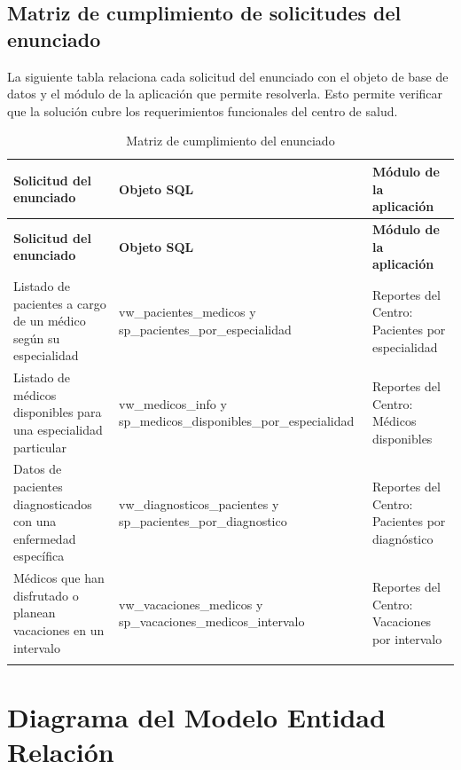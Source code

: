 \documentclass[12pt,a4paper]{article}
\begin{document}
\vspace{0.5cm}

\subsection{Matriz de cumplimiento de solicitudes del enunciado}

La siguiente tabla relaciona cada solicitud del enunciado con el objeto de base de datos y el módulo de la aplicación que permite resolverla. Esto permite verificar que la solución cubre los requerimientos funcionales del centro de salud.

{\small
\begin{longtable}{|p{5cm}|p{4cm}|p{5cm}|}
\hline
\textbf{Solicitud del enunciado} & \textbf{Objeto SQL} & \textbf{Módulo de la aplicación} \\ \hline
\endfirsthead
\hline
\textbf{Solicitud del enunciado} & \textbf{Objeto SQL} & \textbf{Módulo de la aplicación} \\ \hline
\endhead

Listado de pacientes a cargo de un médico según su especialidad & vw\_pacientes\_medicos y sp\_pacientes\_por\_especialidad & Reportes del Centro: Pacientes por especialidad \\ \hline

Listado de médicos disponibles para una especialidad particular & vw\_medicos\_info y sp\_medicos\_disponibles\_por\_especialidad & Reportes del Centro: Médicos disponibles \\ \hline

Datos de pacientes diagnosticados con una enfermedad específica & vw\_diagnosticos\_pacientes y sp\_pacientes\_por\_diagnostico & Reportes del Centro: Pacientes por diagnóstico \\ \hline

Médicos que han disfrutado o planean vacaciones en un intervalo & vw\_vacaciones\_medicos y sp\_vacaciones\_medicos\_intervalo & Reportes del Centro: Vacaciones por intervalo \\ \hline

\caption{Matriz de cumplimiento del enunciado}
\end{longtable}}

\newpage
\section{Diagrama del Modelo Entidad Relaci\'on}
\end{document}
